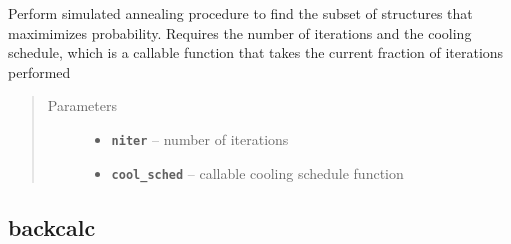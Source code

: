 \documentclass[letterpaper,10pt,english]{sphinxmanual}
\begin{document}
\begin{fulllineitems}
\begin{fulllineitems}
\end{fulllineitems}


\begin{fulllineitems}
\label{modules:eisd.EISDOPT.opt}
Perform simulated annealing procedure to find the subset of structures
that maximimizes probability. Requires the number of iterations and
the cooling schedule, which is a callable function that takes the
current fraction of iterations performed
\begin{quote}\begin{description}
\item[{Parameters}] \leavevmode\begin{itemize}
\item {} 
\textbf{\texttt{niter}} -- number of iterations

\item {} 
\textbf{\texttt{cool\_sched}} -- callable cooling schedule function

\end{itemize}

\end{description}\end{quote}

\end{fulllineitems}


\end{fulllineitems}



\subsection{backcalc}
\label{modules:module-backcalc}\label{modules:backcalc}
\end{document}
